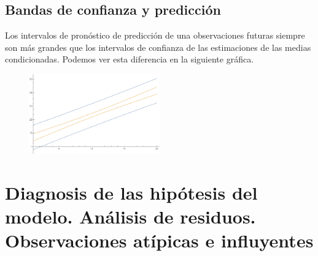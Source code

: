 \subsection{Bandas de confianza y predicción}
\noindent Los intervalos de pronóstico de predicción de una observaciones futuras siempre son más grandes que los intervalos de confianza de las estimaciones de las medias condicionadas. Podemos ver esta diferencia en la siguiente gráfica.
\begin{figure}[h]
    \centering
    \includegraphics[width=0.5\textwidth]{imagenes1/bandas.png}
\end{figure}

\section{Diagnosis de las hipótesis del modelo. Análisis de residuos. Observaciones atípicas e influyentes}

